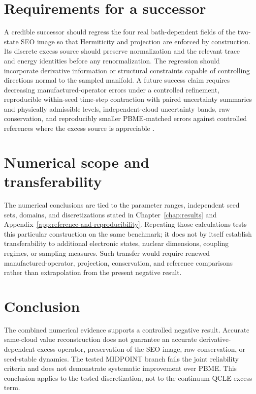 \documentclass[
  11pt,
  letterpaper,
  onehalfspacing,
  normalmargins,
  equalmargins,
  oneside
]{ut-thesis}
\begin{document}
\section{Requirements for a successor}
\label{sec:discussion-successor}

A credible successor should regress the four real bath-dependent fields of the
two-state SEO image so that Hermiticity and projection are enforced by
construction. Its discrete excess source should preserve normalization and
the relevant trace and energy identities before any renormalization. The
regression should incorporate derivative information or structural constraints
capable of controlling directions normal to the sampled manifold. A future
success claim requires decreasing manufactured-operator errors under a
controlled refinement, reproducible within-seed time-step contraction with
paired uncertainty summaries and physically admissible levels,
independent-cloud uncertainty bands, raw conservation, and reproducibly
smaller PBME-matched errors against controlled references where the excess
source is appreciable
\cite{TraskBochevPerego2020,BonetLok1999,Monaghan2005}.

\section{Numerical scope and transferability}
\label{sec:discussion-numerical-scope}

The numerical conclusions are tied to the parameter ranges, independent seed
sets, domains, and discretizations stated in Chapter~\ref{chap:results} and
Appendix~\ref{app:reference-and-reproducibility}. Repeating those calculations
tests this particular construction on the same benchmark; it does not by
itself establish transferability to additional electronic states, nuclear
dimensions, coupling regimes, or sampling measures. Such transfer would
require renewed manufactured-operator, projection, conservation, and
reference comparisons rather than extrapolation from the present negative
result.

\section{Conclusion}
\label{sec:discussion-conclusions}

The combined numerical evidence supports a controlled negative result.
Accurate same-cloud value reconstruction does not guarantee an accurate
derivative-dependent excess operator, preservation of the SEO image, raw
conservation, or seed-stable dynamics. The tested MIDPOINT branch fails the
joint reliability criteria and does not demonstrate systematic improvement
over PBME. This conclusion applies to the tested discretization, not to the
continuum QCLE excess term.
\end{document}

